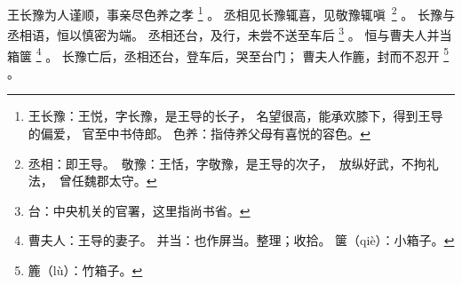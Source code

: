 
\switchcolumn*[\section{}]

王长豫为人谨顺，事亲尽色养之孝%
\footnote{%
    王长豫：王悦，字长豫，是王导的长子，
            名望很高，能承欢膝下，得到王导的偏爱，
            官至中书侍郎。
    色养：指侍养父母有喜悦的容色。
}%
。
丞相见长豫辄喜，见敬豫辄\mbox{嗔%
\footnote{%
    丞相：即王导。
    敬豫：王恬，字敬豫，是王导的次子，
          放纵好武，不拘礼法，
          曾任魏郡太守。
}}%
。
长豫与丞相语，恒以慎密为端。
丞相还台，及行，未尝不送至车后%
\footnote{%
    台：中央机关的官署，这里指尚书省。
}%
。
恒与曹夫人并当箱箧%
\footnote{%
    曹夫人：王导的妻子。
    并当：也作屏当。整理；收拾。
    箧（qiè）：小箱子。
}%
。
长豫亡后，丞相还台，登车后，哭至台门；
曹夫人作簏，封而不忍开%
\footnote{%
    簏（lù）：竹箱子。
}%
。

\switchcolumn


